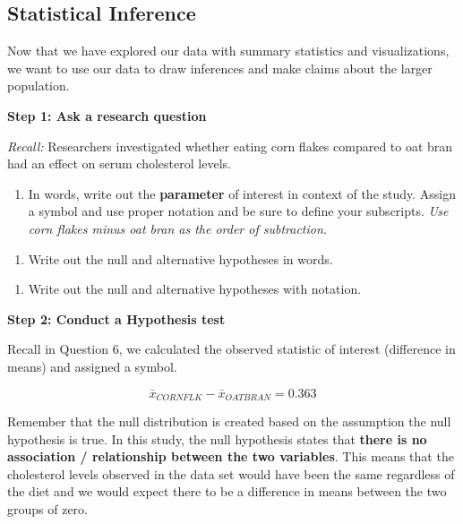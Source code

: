 \documentclass[
  letterpaper,
  DIV=11,
  numbers=noendperiod]{scrartcl}
\providecommand{\tightlist}{%
  \setlength{\itemsep}{0pt}\setlength{\parskip}{0pt}}\usepackage{longtable,booktabs,array}
\begin{document}
\newpage

\hypertarget{statistical-inference}{%
\subsection{Statistical Inference}\label{statistical-inference}}

Now that we have explored our data with summary statistics and
visualizations, we want to use our data to draw inferences and make
claims about the larger population.

\textbf{Step 1: Ask a research question}

\emph{Recall:} Researchers investigated whether eating corn flakes
compared to oat bran had an effect on serum cholesterol levels.

\begin{enumerate}
\def\labelenumi{\arabic{enumi}.}
\setcounter{enumi}{12}
\tightlist
\item
  In words, write out the \textbf{parameter} of interest in context of
  the study. Assign a symbol and use proper notation and be sure to
  define your subscripts. \emph{Use corn flakes minus oat bran as the
  order of subtraction.}
\end{enumerate}

\vspace{1in}

\begin{enumerate}
\def\labelenumi{\arabic{enumi}.}
\setcounter{enumi}{13}
\tightlist
\item
  Write out the null and alternative hypotheses in words.
\end{enumerate}

\vspace{1in}

\begin{enumerate}
\def\labelenumi{\arabic{enumi}.}
\setcounter{enumi}{14}
\tightlist
\item
  Write out the null and alternative hypotheses with notation.
\end{enumerate}

\vspace{1in}

\textbf{Step 2: Conduct a Hypothesis test}

Recall in Question 6, we calculated the observed statistic of interest
(difference in means) and assigned a symbol.

\[\bar x_{CORNFLK} - \bar x_{OATBRAN} = 0.363\]

Remember that the null distribution is created based on the assumption
the null hypothesis is true. In this study, the null hypothesis states
that \textbf{there is no association / relationship between the two
variables}. This means that the cholesterol levels observed in the data
set would have been the same regardless of the diet and we would expect
there to be a difference in means between the two groups of zero.
\end{document}

